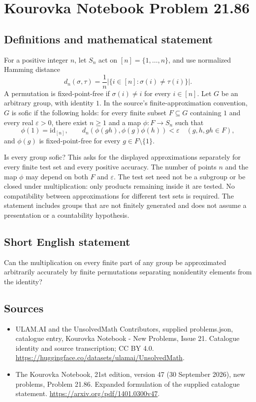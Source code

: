 \documentclass[11pt,a4paper]{article}
\begin{document}
\section*{Kourovka Notebook Problem 21.86}\label{statement}

\subsection{Definitions and mathematical statement}
For a positive integer $n$, let $S_n$ act on $[n]=\{1,\ldots,n\}$, and use normalized Hamming distance
\[
 d_n(\sigma,\tau)=\frac{1}{n}|\{i\in[n]:\sigma(i)\ne\tau(i)\}|.
\]
A permutation is fixed-point-free if $\sigma(i)\ne i$ for every $i\in[n]$. Let $G$ be an arbitrary group, with identity $1$. In the source's finite-approximation convention, $G$ is sofic if the following holds: for every finite subset $F\subseteq G$ containing $1$ and every real $\varepsilon>0$, there exist $n\ge1$ and a map $\phi:F\to S_n$ such that
\[
 \phi(1)=\mathrm{id}_{[n]},\qquad
 d_n(\phi(gh),\phi(g)\phi(h))<\varepsilon
 \quad(g,h,gh\in F),
\]
and $\phi(g)$ is fixed-point-free for every $g\in F\setminus\{1\}$.

Is every group sofic? This asks for the displayed approximations separately for every finite test set and every positive accuracy. The number of points $n$ and the map $\phi$ may depend on both $F$ and $\varepsilon$. The test set need not be a subgroup or be closed under multiplication: only products remaining inside it are tested. No compatibility between approximations for different test sets is required. The statement includes groups that are not finitely generated and does not assume a presentation or a countability hypothesis.
\subsection{Short English statement}
Can the multiplication on every finite part of any group be approximated arbitrarily accurately by finite permutations separating nonidentity elements from the identity?
\subsection{Sources}
\begin{itemize}
\item[S1] ULAM.AI and the UnsolvedMath Contributors, supplied problems.json, catalogue entry, Kourovka Notebook - New Problems, Issue 21. Catalogue identity and source transcription; CC BY 4.0.
\url{https://huggingface.co/datasets/ulamai/UnsolvedMath}.
\item[S2] The Kourovka Notebook, 21st edition, version 47 (30 September 2026), new problems, Problem 21.86. Expanded formulation of the supplied catalogue statement.
\url{https://arxiv.org/pdf/1401.0300v47}.
\end{itemize}
\end{document}

